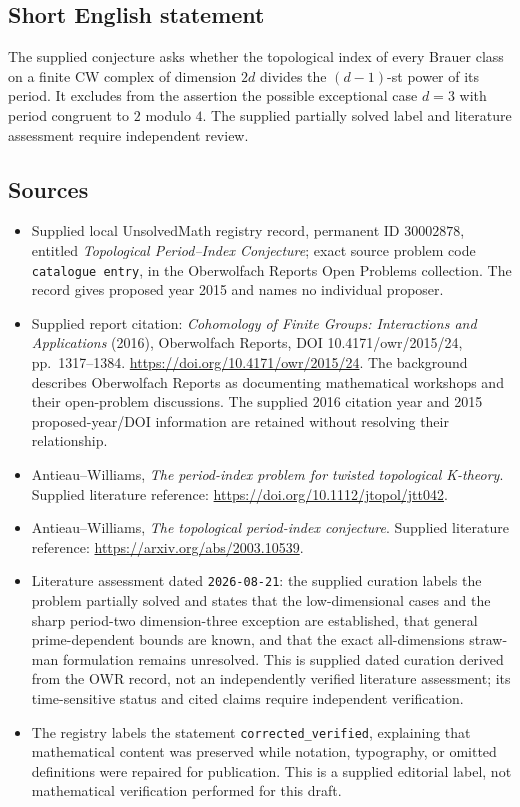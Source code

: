 \documentclass[11pt]{article}
\begin{document}
\subsection{Short English statement}
The supplied conjecture asks whether the topological index of every Brauer class on a finite CW complex of dimension \(2d\) divides the \((d-1)\)-st power of its period. It excludes from the assertion the possible exceptional case \(d=3\) with period congruent to \(2\) modulo \(4\). The supplied partially solved label and literature assessment require independent review.
\subsection{Sources}
\begin{itemize}
\item Supplied local UnsolvedMath registry record, permanent ID \(30002878\), entitled \emph{Topological Period--Index Conjecture}; exact source problem code \texttt{catalogue entry}, in the Oberwolfach Reports Open Problems collection. The record gives proposed year 2015 and names no individual proposer.
\item Supplied report citation: \emph{Cohomology of Finite Groups: Interactions and Applications} (2016), Oberwolfach Reports, DOI 10.4171/owr/2015/24, pp.\ 1317--1384. \url{https://doi.org/10.4171/owr/2015/24}. The background describes Oberwolfach Reports as documenting mathematical workshops and their open-problem discussions. The supplied 2016 citation year and 2015 proposed-year/DOI information are retained without resolving their relationship.
\item Antieau--Williams, \emph{The period-index problem for twisted topological K-theory}. Supplied literature reference: \url{https://doi.org/10.1112/jtopol/jtt042}.
\item Antieau--Williams, \emph{The topological period-index conjecture}. Supplied literature reference: \url{https://arxiv.org/abs/2003.10539}.
\item Literature assessment dated \texttt{2026-08-21}: the supplied curation labels the problem partially solved and states that the low-dimensional cases and the sharp period-two dimension-three exception are established, that general prime-dependent bounds are known, and that the exact all-dimensions straw-man formulation remains unresolved. This is supplied dated curation derived from the OWR record, not an independently verified literature assessment; its time-sensitive status and cited claims require independent verification.
\item The registry labels the statement \texttt{corrected\_verified}, explaining that mathematical content was preserved while notation, typography, or omitted definitions were repaired for publication. This is a supplied editorial label, not mathematical verification performed for this draft.
\end{itemize}
\end{document}
